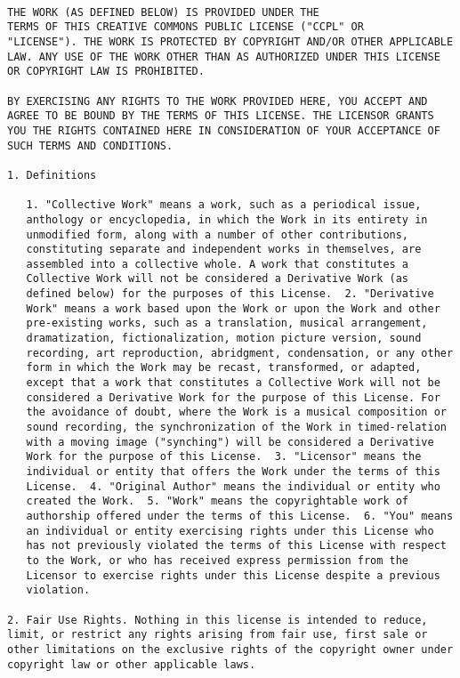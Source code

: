 \begin{lstlisting}

THE WORK (AS DEFINED BELOW) IS PROVIDED UNDER THE
TERMS OF THIS CREATIVE COMMONS PUBLIC LICENSE ("CCPL" OR
"LICENSE"). THE WORK IS PROTECTED BY COPYRIGHT AND/OR OTHER APPLICABLE
LAW. ANY USE OF THE WORK OTHER THAN AS AUTHORIZED UNDER THIS LICENSE
OR COPYRIGHT LAW IS PROHIBITED.

BY EXERCISING ANY RIGHTS TO THE WORK PROVIDED HERE, YOU ACCEPT AND
AGREE TO BE BOUND BY THE TERMS OF THIS LICENSE. THE LICENSOR GRANTS
YOU THE RIGHTS CONTAINED HERE IN CONSIDERATION OF YOUR ACCEPTANCE OF
SUCH TERMS AND CONDITIONS.

1. Definitions

   1. "Collective Work" means a work, such as a periodical issue,
   anthology or encyclopedia, in which the Work in its entirety in
   unmodified form, along with a number of other contributions,
   constituting separate and independent works in themselves, are
   assembled into a collective whole. A work that constitutes a
   Collective Work will not be considered a Derivative Work (as
   defined below) for the purposes of this License.  2. "Derivative
   Work" means a work based upon the Work or upon the Work and other
   pre-existing works, such as a translation, musical arrangement,
   dramatization, fictionalization, motion picture version, sound
   recording, art reproduction, abridgment, condensation, or any other
   form in which the Work may be recast, transformed, or adapted,
   except that a work that constitutes a Collective Work will not be
   considered a Derivative Work for the purpose of this License. For
   the avoidance of doubt, where the Work is a musical composition or
   sound recording, the synchronization of the Work in timed-relation
   with a moving image ("synching") will be considered a Derivative
   Work for the purpose of this License.  3. "Licensor" means the
   individual or entity that offers the Work under the terms of this
   License.  4. "Original Author" means the individual or entity who
   created the Work.  5. "Work" means the copyrightable work of
   authorship offered under the terms of this License.  6. "You" means
   an individual or entity exercising rights under this License who
   has not previously violated the terms of this License with respect
   to the Work, or who has received express permission from the
   Licensor to exercise rights under this License despite a previous
   violation.

2. Fair Use Rights. Nothing in this license is intended to reduce,
limit, or restrict any rights arising from fair use, first sale or
other limitations on the exclusive rights of the copyright owner under
copyright law or other applicable laws.


\end{lstlisting}

